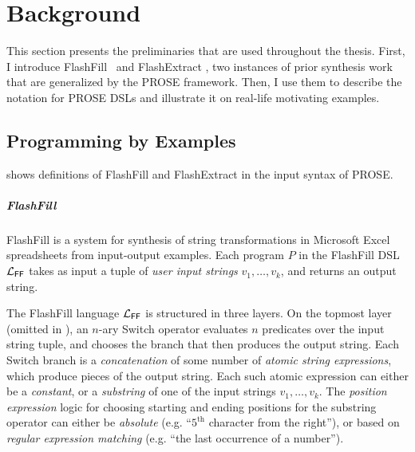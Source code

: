 \chapter{Background}
\label{ch:background}
This section presents the preliminaries that are used throughout the thesis.
First, I introduce FlashFill~\cite{flashfill} and FlashExtract \cite{flashextract}, two instances of prior
synthesis work that are generalized by the PROSE framework.
Then, I use them to describe the notation for PROSE DSLs and illustrate it on real-life motivating examples.

\section{Programming by Examples}
\label{sec:background:pbe}

 shows definitions of FlashFill and FlashExtract in the input syntax of PROSE.

\paragraph{FlashFill}
FlashFill is a system for synthesis of string transformations in Microsoft Excel spreadsheets from input-output examples.
Each program $P$ in the FlashFill DSL $\mathcal{L}_{\mathsf{FF}}$ takes as input a tuple of \emph{user input strings} $v_1, \dots, v_k$,
and returns an output string.

The FlashFill language $\mathcal{L}_{\mathsf{FF}}$ is structured in three layers.
On the topmost layer (omitted in ), an $n$-ary
\textsf{Switch} operator evaluates $n$ predicates over the input string tuple, and chooses the branch that then produces
the output string.
Each \textsf{Switch} branch is a \emph{concatenation} of some number of \emph{atomic string expressions}, which
produce pieces of the output string.
Each such atomic expression can either be a \emph{constant}, or a \emph{substring} of one of the input strings $v_1,
\dots, v_k$.
The \emph{position expression} logic for choosing starting and ending positions for the substring operator can either be
\emph{absolute} (e.g.  ``$5^{\text{th}}$ character from the right''), or based on \emph{regular expression matching}
(e.g. ``the last occurrence of a number'').


